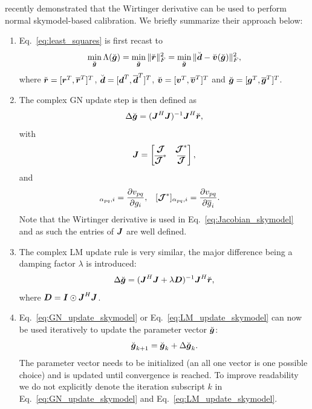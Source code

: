 \documentclass[useAMS,usenatbib]{mn2e}
\newcommand{\br}{\bmath{r}}
\newcommand{\bg}{\bmath{g}}
\newcommand{\bd}{\bmath{d}}
\newcommand{\bv}{\bmath{v}}
\newcommand{\bJ}{\bmath{J}}
\newcommand{\bD}{\bmath{D}}
\newcommand{\bI}{\bmath{I}}
\newcommand{\bmJ}{\bmath{\mathcal{J}}}
\newcommand{\conj}[1]{\overline{#1}}
\begin{document}
\citet{Smirnov2015} recently demonstrated that the Wirtinger derivative can be used to perform normal skymodel-based calibration. We briefly summarize their approach below:
\begin{enumerate}

\item Eq.~\eqref{eq:least_squares} is first recast to
\begin{equation}
\label{eq:least_squares_augmented}
\min_{\breve{\bg}} \Lambda(\breve{\bg}) = \min_{\breve{\bg}} \|\breve{\br}\|_F^2 = \min_{\breve{\bg}} \|\breve{\bd} - \breve{\bv}(\breve{\bg})\|_F^2, 
\end{equation} 
where $\breve{\br} = [\br^T,\conj{\br}^T]^T$, $\breve{\bd} = [\bd^T,\conj{\bd}^T]^T$, $\breve{\bv} = [\bv^T,\conj{\bv}^T]^T$ and $\breve{\bg} = [\bg^T,\conj{\bg}^T]^T$.
\item The complex GN update step is then defined as
\begin{equation}
\label{eq:GN_update_skymodel}
 \Delta \breve{\bg} = (\bJ^H\bJ)^{-1}\bJ^H\breve{\br},
\end{equation}
with 
\begin{equation}
\label{eq:Jacobian_skymodel}
\bJ = \begin{bmatrix}
       \bmJ & \bmJ^*\\
       \conj{\bmJ}^* & \conj{\bmJ} 
      \end{bmatrix},
\end{equation}
and
\begin{align}
[\bmJ]_{\alpha_{pq},i} &= \frac{\partial v_{pq}}{\partial g_i}, & [\bmJ^*]_{\alpha_{pq},i} &= \frac{\partial v_{pq}}{\partial \conj{g}_i}. 
\end{align}
Note that the Wirtinger derivative is used in Eq.~\eqref{eq:Jacobian_skymodel} and as such the entries of $\bJ$ are well defined.
\item The complex LM update rule is very similar, the major difference being a damping factor $\lambda$ is introduced:
\begin{equation}
\label{eq:LM_update_skymodel}
\Delta \breve{\bg} = (\bJ^H\bJ + \lambda\bD)^{-1}\bJ^H\breve{\br},
\end{equation}
where $\bD=\bI\odot\bJ^H\bJ$.
\item Eq.~\eqref{eq:GN_update_skymodel} or Eq.~\eqref{eq:LM_update_skymodel} can now be used iteratively to update the 
parameter vector $\breve{\bg}$:
\begin{equation}
\label{eq:update}
\breve{\bg}_{k+1} = \breve{\bg}_{k} + \Delta \breve{\bg}_{k}. 
\end{equation}
The parameter vector needs to be initialized (an all one vector is one possible choice) and is updated until convergence is reached. To improve readability we do not explicitly denote the iteration subscript $k$ in 
Eq.~\eqref{eq:GN_update_skymodel} and Eq.~\eqref{eq:LM_update_skymodel}.
\end{enumerate}
\end{document}

